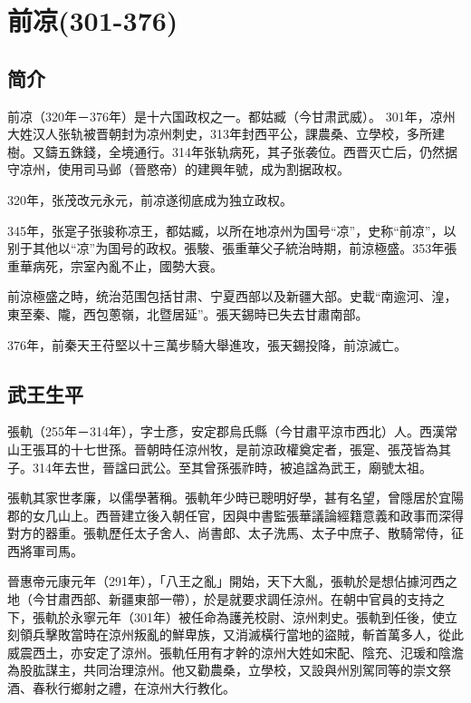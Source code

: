 

\section{前凉\tiny(301-376)}

\subsection{简介}

前凉（320年－376年）是十六国政权之一。都姑臧（今甘肃武威）。 301年，凉州大姓汉人张轨被晋朝封为凉州刺史，313年封西平公，課農桑、立學校，多所建樹。又鑄五銖錢，全境通行。314年张轨病死，其子张袭位。西晋灭亡后，仍然据守凉州，使用司马邺（晉愍帝）的建興年號，成为割据政权。

320年，张茂改元永元，前凉遂彻底成为独立政权。

345年，张寔子张骏称凉王，都姑臧，以所在地凉州为国号“凉”，史称“前凉”，以别于其他以“凉”为国号的政权。張駿、張重華父子統治時期，前涼極盛。353年張重華病死，宗室內亂不止，國勢大衰。

前涼極盛之時，统治范围包括甘肃、宁夏西部以及新疆大部。史載“南逾河、湟，東至秦、隴，西包蔥嶺，北暨居延”。張天錫時已失去甘肅南部。

376年，前秦天王苻堅以十三萬步騎大舉進攻，張天錫投降，前涼滅亡。

\subsection{武王生平}

張軌（255年－314年），字士彥，安定郡烏氏縣（今甘肅平涼市西北）人。西漢常山王張耳的十七世孫。晉朝時任涼州牧，是前涼政權奠定者，張寔、張茂皆為其子。314年去世，晉諡曰武公。至其曾孫張祚時，被追諡為武王，廟號太祖。

張軌其家世孝廉，以儒學著稱。張軌年少時已聰明好學，甚有名望，曾隱居於宜陽郡的女几山上。西晉建立後入朝任官，因與中書監張華議論經籍意義和政事而深得對方的器重。張軌歷任太子舍人、尚書郎、太子洗馬、太子中庶子、散騎常侍，征西將軍司馬。

晉惠帝元康元年（291年），「八王之亂」開始，天下大亂，張軌於是想佔據河西之地（今甘肅西部、新疆東部一帶），於是就要求調任涼州。在朝中官員的支持之下，張軌於永寧元年（301年）被任命為護羌校尉、涼州刺史。張軌到任後，使立刻領兵擊敗當時在涼州叛亂的鮮卑族，又消滅橫行當地的盜賊，斬首萬多人，從此威震西土，亦安定了涼州。張軌任用有才幹的涼州大姓如宋配、陰充、氾瑗和陰澹為股肱謀主，共同治理涼州。他又勸農桑，立學校，又設與州別駕同等的崇文祭酒、春秋行鄉射之禮，在涼州大行教化。

